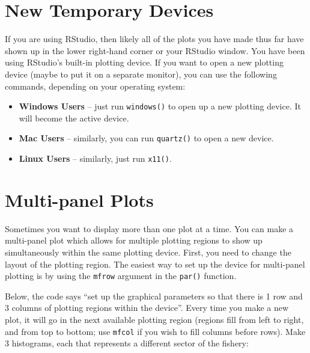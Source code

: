 \documentclass[]{book}
\providecommand{\tightlist}{%
  \setlength{\itemsep}{0pt}\setlength{\parskip}{0pt}}
\theoremstyle{definition}
\theoremstyle{definition}
\theoremstyle{definition}
\theoremstyle{remark}
\begin{document}
\section{New Temporary Devices}\label{new-temporary-devices}

If you are using RStudio, then likely all of the plots you have made
thus far have shown up in the lower right-hand corner or your RStudio
window. You have been using RStudio's built-in plotting device. If you
want to open a new plotting device (maybe to put it on a separate
monitor), you can use the following commands, depending on your
operating system:

\begin{itemize}
\tightlist
\item
  \textbf{Windows Users} -- just run \texttt{windows()} to open up a new
  plotting device. It will become the active device.
\item
  \textbf{Mac Users} -- similarly, you can run \texttt{quartz()} to open
  a new device.
\item
  \textbf{Linux Users} -- similarly, just run \texttt{x11()}.
\end{itemize}

\section{Multi-panel Plots}\label{multi-panel-plots}

Sometimes you want to display more than one plot at a time. You can make
a multi-panel plot which allows for multiple plotting regions to show up
simultaneously within the same plotting device. First, you need to
change the layout of the plotting region. The easiest way to set up the
device for multi-panel plotting is by using the \texttt{mfrow} argument
in the \texttt{par()} function.

Below, the code says ``set up the graphical parameters so that there is
1 row and 3 columns of plotting regions within the device''. Every time
you make a new plot, it will go in the next available plotting region
(regions fill from left to right, and from top to bottom; use
\texttt{mfcol} if you wish to fill columns before rows). Make 3
histograms, each that represents a different sector of the fishery:
\end{document}
